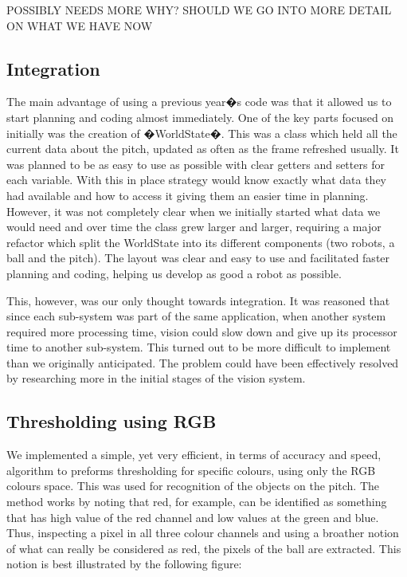 POSSIBLY NEEDS MORE WHY?  SHOULD WE GO INTO MORE DETAIL ON WHAT WE HAVE NOW

\subsection{Integration}

The main advantage of using a previous year�s code was that it allowed us to start planning and coding almost immediately. One of the key parts focused on initially was the creation of �WorldState�. This was a class which held all the current data about the pitch, updated as often as the frame refreshed usually. It was planned to be as easy to use as possible with clear getters and setters for each variable. With this in place strategy would know exactly what data they had available and how to access it giving them an easier time in planning. However, it was not completely clear when we initially started what data we would need and over time the class grew larger and larger, requiring a major refactor which split the WorldState into its different components (two robots, a ball and the pitch). The layout was clear and easy to use and facilitated faster planning and coding, helping us develop as good a robot as possible.

This, however, was our only thought towards integration. It was reasoned that since each sub-system was part of the same application, when another system required more processing time, vision could slow down and give up its processor time to another sub-system. This turned out to be more difficult to implement than we originally anticipated. The problem could have been effectively resolved by researching more in the initial stages of the vision system.

\subsection{Thresholding using RGB}

We implemented a simple, yet very efficient, in terms of accuracy and speed, algorithm to preforms thresholding for specific colours, using only the RGB colours space. This was used for recognition of the objects on the pitch. The method works by noting that red, for example, can be identified as something that has high value of the red channel and low values at the green and blue.  Thus, inspecting a pixel in all three colour channels and using a broather notion of what can really be considered as red, the pixels of the ball are extracted. This notion is best illustrated by the following figure: 



